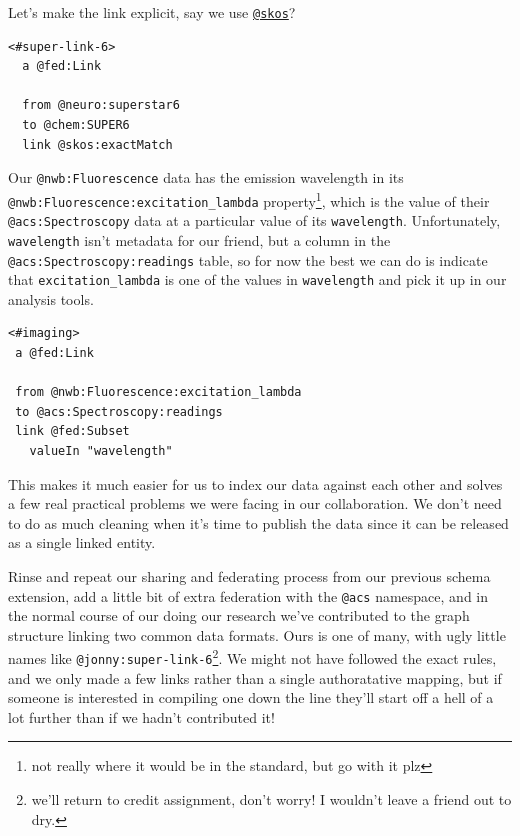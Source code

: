\documentclass[10pt]{tufte-book}
\begin{document}
Let's make the link explicit, say we use
\href{https://www.w3.org/2009/08/skos-reference/skos.html}{\texttt{@skos}}?

\begin{verbatim}
<#super-link-6>
  a @fed:Link
  
  from @neuro:superstar6
  to @chem:SUPER6
  link @skos:exactMatch
\end{verbatim}

Our \texttt{@nwb:Fluorescence} data has the emission wavelength in its
\texttt{@nwb:Fluorescence:excitation\_lambda} property\footnote{not
  really where it would be in the standard, but go with it plz}, which
is the value of their \texttt{@acs:Spectroscopy} data at a particular
value of its \texttt{wavelength}. Unfortunately, \texttt{wavelength}
isn't metadata for our friend, but a column in the
\texttt{@acs:Spectroscopy:readings} table, so for now the best we can do
is indicate that \texttt{excitation\_lambda} is one of the values in
\texttt{wavelength} and pick it up in our analysis tools.

\begin{verbatim}
<#imaging>
 a @fed:Link
 
 from @nwb:Fluorescence:excitation_lambda
 to @acs:Spectroscopy:readings
 link @fed:Subset
   valueIn "wavelength"
\end{verbatim}

This makes it much easier for us to index our data against each other
and solves a few real practical problems we were facing in our
collaboration. We don't need to do as much cleaning when it's time to
publish the data since it can be released as a single linked entity.

Rinse and repeat our sharing and federating process from our previous
schema extension, add a little bit of extra federation with the
\texttt{@acs} namespace, and in the normal course of our doing our
research we've contributed to the graph structure linking two common
data formats. Ours is one of many, with ugly little names like
\texttt{@jonny:super-link-6}\footnote{we'll return to credit assignment,
  don't worry! I wouldn't leave a friend out to dry.}. We might not have
followed the exact rules, and we only made a few links rather than a
single authoratative mapping, but if someone is interested in compiling
one down the line they'll start off a hell of a lot further than if we
hadn't contributed it!
\end{document}
